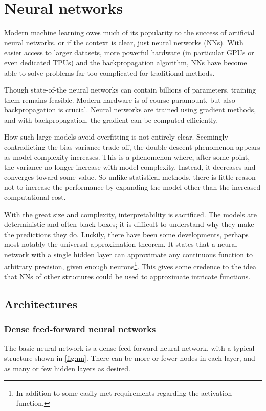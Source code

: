 \section{Neural networks}
Modern machine learning owes much of its popularity to the success of artificial neural networks, or if the context is clear, just neural networks (NNs).
With easier access to larger datasets, more powerful hardware (in particular GPUs or even dedicated TPUs) and the backpropagation algorithm, NNs have become able to solve problems far too complicated for traditional methods.

Though state-of-the neural networks can contain billions of parameters, training them remains feasible.
Modern hardware is of course paramount, but also backpropagation is crucial.
Neural networks are trained using gradient methods, and with backpropagation, the gradient can be computed efficiently.

How such large models avoid overfitting is not entirely clear.
Seemingly contradicting the bias-variance trade-off, the double descent phenomenon appears as model complexity increases.
This is a phenomenon where, after some point, the variance no longer increase with model complexity.
Instead, it decreases and converges toward some value.
So unlike statistical methods, there is little reason not to increase the performance by expanding the model other than the increased computational cost.

With the great size and complexity, interpretability is sacrificed.
The models are deterministic and often black boxes; it is difficult to understand why they make the predictions they do.
Luckily, there have been some developments, perhaps most notably the universal approximation theorem.
It states that a neural network with a single hidden layer can approximate any continuous function to arbitrary precision, given enough neurons\footnote{In addition to some easily met requirements regarding the activation function.}.
This gives some credence to the idea that NNs of other structures could be used to approximate intricate functions.


\subsection{Architectures}
\subsubsection{Dense feed-forward neural networks}
The basic neural network is a dense feed-forward neural network, with a typical structure shown in \cref{fig:nn}.
There can be more or fewer nodes in each layer, and as many or few hidden layers as desired.

